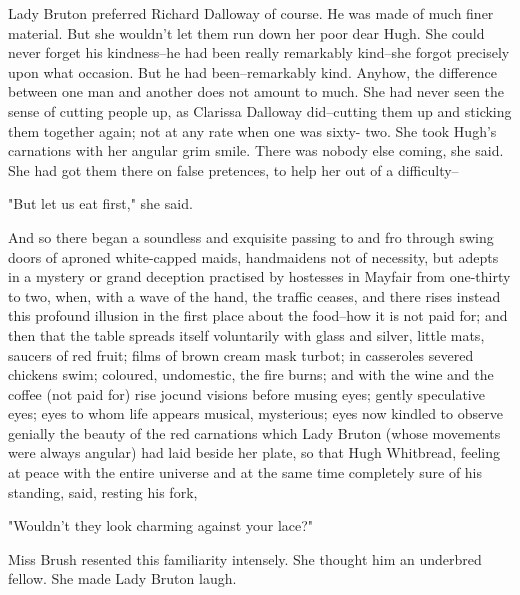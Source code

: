 \documentclass[lang=cn,10pt]{elegantbook}
\begin{document}
Lady Bruton preferred Richard Dalloway of course.  He was made of
much finer material.  But she wouldn't let them run down her poor
dear Hugh.  She could never forget his kindness--he had been really
remarkably kind--she forgot precisely upon what occasion.  But he
had been--remarkably kind.  Anyhow, the difference between one man
and another does not amount to much.  She had never seen the sense
of cutting people up, as Clarissa Dalloway did--cutting them up and
sticking them together again; not at any rate when one was sixty-
two.  She took Hugh's carnations with her angular grim smile.
There was nobody else coming, she said.  She had got them there on
false pretences, to help her out of a difficulty--

"But let us eat first," she said.

And so there began a soundless and exquisite passing to and fro
through swing doors of aproned white-capped maids, handmaidens not
of necessity, but adepts in a mystery or grand deception practised
by hostesses in Mayfair from one-thirty to two, when, with a wave
of the hand, the traffic ceases, and there rises instead this
profound illusion in the first place about the food--how it is not
paid for; and then that the table spreads itself voluntarily with
glass and silver, little mats, saucers of red fruit; films of brown
cream mask turbot; in casseroles severed chickens swim; coloured,
undomestic, the fire burns; and with the wine and the coffee (not
paid for) rise jocund visions before musing eyes; gently
speculative eyes; eyes to whom life appears musical, mysterious;
eyes now kindled to observe genially the beauty of the red
carnations which Lady Bruton (whose movements were always angular)
had laid beside her plate, so that Hugh Whitbread, feeling at peace
with the entire universe and at the same time completely sure of
his standing, said, resting his fork,

"Wouldn't they look charming against your lace?"

Miss Brush resented this familiarity intensely.  She thought him an
underbred fellow.  She made Lady Bruton laugh.
\end{document}
